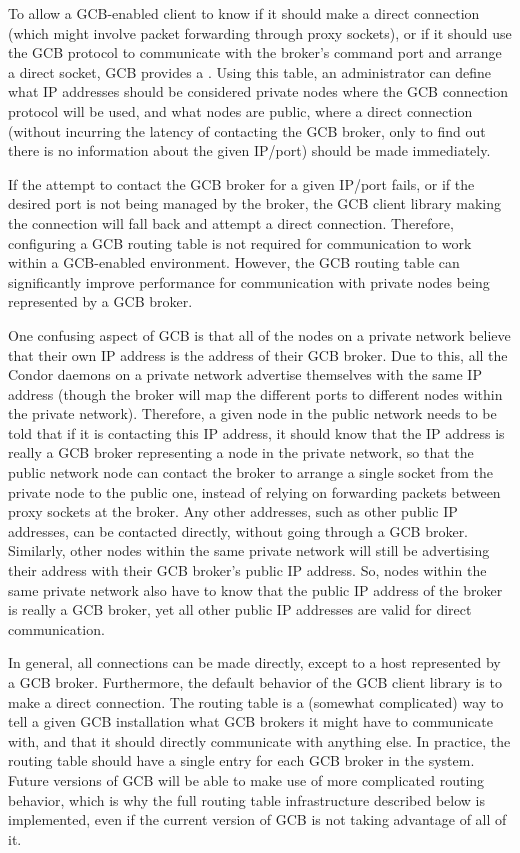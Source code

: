 To allow a GCB-enabled client to know if it should make a direct
connection (which might involve packet forwarding through proxy
sockets), or if it should use the GCB protocol to communicate with the
broker's command port and arrange a direct socket,
GCB provides a .
Using this table, an administrator can define what IP addresses should
be considered private nodes where the GCB connection protocol will be
used, and what nodes are public, where a direct connection (without
incurring the latency of contacting the GCB broker, only to find out
there is no information about the given IP/port) should be made
immediately. 

If the attempt to contact the GCB broker for a given IP/port fails, or
if the desired port is not being managed by the broker, the GCB client
library making the connection will fall back and attempt a direct
connection.
Therefore, configuring a GCB routing table is not required for
communication to work within a GCB-enabled environment.
However, the GCB routing table can significantly improve performance
for communication with private nodes being represented by a GCB
broker. 

One confusing aspect of GCB is that all of the nodes on a private
network believe that their own IP address is the address of their GCB
broker.
Due to this, all the Condor daemons on a private network advertise
themselves with the same IP address (though the broker will map the
different ports to different nodes within the private network).
Therefore, a given node in the public network needs to be told that if
it is contacting this IP address, it should know that the IP address is really
a GCB broker representing a node in the private network, so that 
the public network node
can contact the broker to arrange a single socket from the private
node to the public one, instead of relying on forwarding packets
between proxy sockets at the broker.
Any other addresses, such as other public IP addresses, can be
contacted directly, without going through a GCB broker.
Similarly, other nodes within the same private network will still be
advertising their address with their GCB broker's public IP address.
So, nodes within the same private network also have to know that the
public IP address of the broker is really a GCB broker, yet all other public
IP addresses are valid for direct communication.

In general, all connections can be made directly, except to a host
represented by a GCB broker.
Furthermore, the default behavior of the GCB client library is to make
a direct connection.
The routing table is a (somewhat complicated) way to tell a
given GCB installation what GCB brokers it might have to communicate
with, and that it should directly communicate with anything else.
In practice, the routing table should have a single entry for
each GCB broker in the system.
Future versions of GCB will be able to make use of more complicated
routing behavior, which is why the full routing table infrastructure
described below is implemented, even if the current version of GCB is
not taking advantage of all of it.


